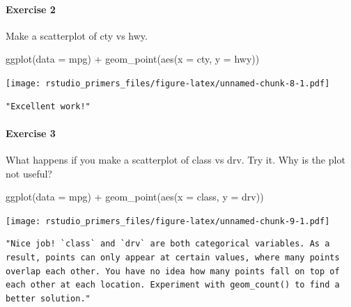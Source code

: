 \documentclass[
]{article}
\newenvironment{Shaded}{\begin{snugshade}}{\end{snugshade}}
\newcommand{\AttributeTok}[1]{\textcolor[rgb]{0.77,0.63,0.00}{#1}}
\newcommand{\FunctionTok}[1]{\textcolor[rgb]{0.00,0.00,0.00}{#1}}
\newcommand{\NormalTok}[1]{#1}
\newcommand{\SpecialCharTok}[1]{\textcolor[rgb]{0.00,0.00,0.00}{#1}}
\begin{document}
\hypertarget{exercise-2}{%
\paragraph{Exercise 2}\label{exercise-2}}

Make a scatterplot of cty vs hwy.

\begin{Shaded}
\begin{Highlighting}[]
\FunctionTok{ggplot}\NormalTok{(}\AttributeTok{data =}\NormalTok{ mpg) }\SpecialCharTok{+}
  \FunctionTok{geom\_point}\NormalTok{(}\FunctionTok{aes}\NormalTok{(}\AttributeTok{x =}\NormalTok{ cty, }\AttributeTok{y =}\NormalTok{ hwy))}
\end{Highlighting}
\end{Shaded}

\texttt{[image: rstudio\_primers\_files/figure-latex/unnamed-chunk-8-1.pdf]}

\begin{verbatim}
"Excellent work!"
\end{verbatim}

\hypertarget{exercise-3}{%
\paragraph{Exercise 3}\label{exercise-3}}

What happens if you make a scatterplot of class vs drv. Try it. Why is
the plot not useful?

\begin{Shaded}
\begin{Highlighting}[]
\FunctionTok{ggplot}\NormalTok{(}\AttributeTok{data =}\NormalTok{ mpg) }\SpecialCharTok{+}
  \FunctionTok{geom\_point}\NormalTok{(}\FunctionTok{aes}\NormalTok{(}\AttributeTok{x =}\NormalTok{ class, }\AttributeTok{y =}\NormalTok{ drv))}
\end{Highlighting}
\end{Shaded}

\texttt{[image: rstudio\_primers\_files/figure-latex/unnamed-chunk-9-1.pdf]}

\begin{verbatim}
"Nice job! `class` and `drv` are both categorical variables. As a result, points can only appear at certain values, where many points overlap each other. You have no idea how many points fall on top of each other at each location. Experiment with geom_count() to find a better solution."
\end{verbatim}
\end{document}
